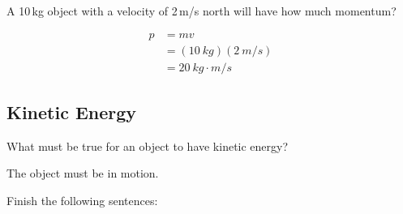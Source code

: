 \documentclass[../main-physics-problems.tex]{subfiles}
\begin{document}
\begin{questions}


\question 
A 10\,kg object with a velocity of 2\,m/s north will have how much momentum?

\begin{solution}
    \begin{align*}
        p &= mv\\[1ex]
          &= (\SI{10}{kg})(\SI{2}{m/s})\\[1ex]
          &= \boxed{\SI{20}{kg\cdot m/s}}
    \end{align*}
\end{solution}

\clearpage
\begin{EnvUplevel}
    \subsection{Kinetic Energy}
\end{EnvUplevel}

\question
What must be true for an object to have kinetic energy?

\begin{solution}
    The object must be in motion.
\end{solution}

\question 
Finish the following sentences:

\end{questions}
\end{document}
